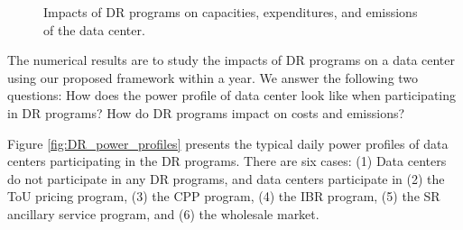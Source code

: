 {\begin{figure}[!h]
	\begin{center}
		\caption{Impacts of DR programs on capacities, expenditures, and emissions of the data center. }         
		\label{fig:DR_programs}
	\end{center}
	\vspace{-0.5cm}
\end{figure}
}
The numerical results are to study the impacts of DR programs on a data center using our proposed framework within a year. We answer the following two questions: How does the power profile of data center look like when participating in DR programs? How do DR programs impact on costs and emissions? 

Figure \ref{fig:DR_power_profiles} presents the typical daily power profiles of data centers participating in the DR programs. There are six cases: (1) Data centers do not participate in any DR programs, and data centers participate in (2) the ToU pricing program, (3) the CPP program, (4) the IBR program, (5) the SR ancillary service program, and (6) the wholesale market.

